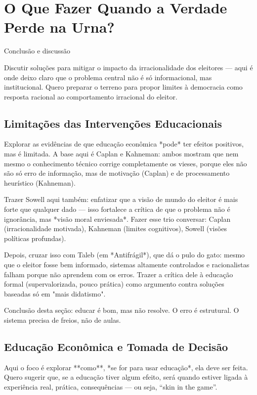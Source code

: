 \chapter{O Que Fazer Quando a Verdade Perde na Urna?} 

Conclusão e discussão

Discutir soluções para mitigar o impacto da irracionalidade dos eleitores — aqui é onde deixo claro que o problema central não é só informacional, mas institucional. Quero preparar o terreno para propor limites à democracia como resposta racional ao comportamento irracional do eleitor.

\section{Limitações das Intervenções Educacionais} 

Explorar as evidências de que educação econômica *pode* ter efeitos positivos, mas é limitada. A base aqui é Caplan e Kahneman: ambos mostram que nem mesmo o conhecimento técnico corrige completamente os vieses, porque eles não são só erro de informação, mas de motivação (Caplan) e de processamento heurístico (Kahneman).

Trazer Sowell aqui também: enfatizar que a visão de mundo do eleitor é mais forte que qualquer dado — isso fortalece a crítica de que o problema não é ignorância, mas *visão moral enviesada*. Fazer esse trio conversar: Caplan (irracionalidade motivada), Kahneman (limites cognitivos), Sowell (visões políticas profundas).

Depois, cruzar isso com Taleb (em *Antifrágil*), que dá o pulo do gato: mesmo que o eleitor fosse bem informado, sistemas altamente controlados e racionalistas falham porque não aprendem com os erros. Trazer a crítica dele à educação formal (supervalorizada, pouco prática) como argumento contra soluções baseadas só em "mais didatismo".

Conclusão desta seção: educar é bom, mas não resolve. O erro é estrutural. O sistema precisa de freios, não de aulas.

\section{Educação Econômica e Tomada de Decisão} 

Aqui o foco é explorar **como**, *se for para usar educação*, ela deve ser feita. Quero sugerir que, se a educação tiver algum efeito, será quando estiver ligada à experiência real, prática, consequências — ou seja, “skin in the game”.

